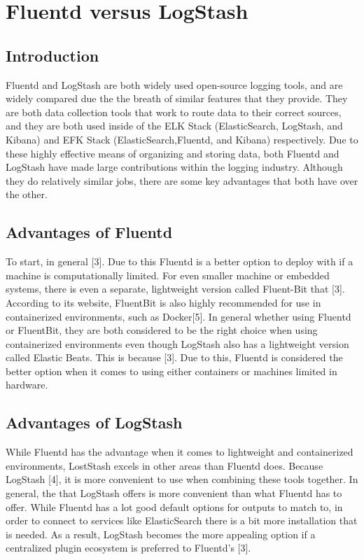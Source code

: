 \documentclass{article}
\begin{document}
\section{Fluentd versus LogStash} \label{sec:comp}
\subsection{Introduction}
\quad \quad
Fluentd and LogStash are both widely used open-source logging tools, and are widely compared due the the breath of similar features that 
they provide. They are both data collection tools that work to route data to their correct sources, and they are both used inside of the 
ELK Stack (ElasticSearch, LogStash, and Kibana) and EFK Stack (ElasticSearch,Fluentd, and Kibana) respectively. Due to these highly effective means of organizing and storing data, both 
Fluentd and LogStash have made large contributions within the logging industry. Although they do relatively similar jobs, there are some key advantages that both have over the other.
\subsection{Advantages of Fluentd}
\quad \quad
To start, in general [3]. Due to this Fluentd is a better option to deploy with if a machine is
computationally limited. For even smaller machine or embedded systems, there is even a separate, lightweight version called Fluent-Bit that [3]. According to its website,
FluentBit is also highly recommended for use in containerized environments, such as Docker[5]. In general whether using Fluentd or FluentBit, they are both considered to be the right choice when using containerized environments even 
though LogStash also has a lightweight version called Elastic Beats. This is because [3].
Due to this, Fluentd is considered the better option when it comes to using either containers or machines limited in hardware.
\subsection{Advantages of LogStash}
\quad \quad
While Fluentd has the advantage when it comes to lightweight and containerized environments, LostStash excels in other areas than Fluentd does. Because LogStash [4], it 
is more convenient to use when combining these tools together. In general, the  that LogStash offers is more convenient than what Fluentd has to offer. While Fluentd has a lot good
default options for outputs to match to, in order to connect to services like ElasticSearch there is a bit more installation that is needed. As a result, LogStash becomes the more appealing option if a centralized plugin ecosystem is preferred to 
Fluentd's [3].
\end{document}
